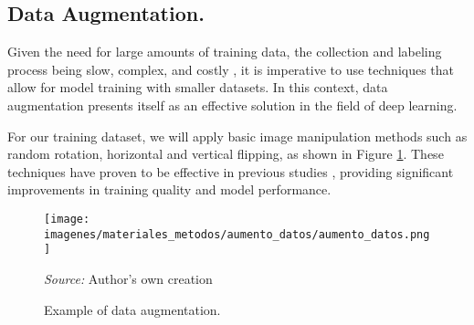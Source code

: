 \subsection{Data Augmentation.}

Given the need for large amounts of training data, the collection and labeling process being slow, complex, and costly \cite{22Toke2020}, it is imperative to use techniques that allow for model training with smaller datasets. In this context, data augmentation presents itself as an effective solution in the field of deep learning.

For our training dataset, we will apply basic image manipulation methods such as random rotation, horizontal and vertical flipping, as shown in Figure \ref{fig:aumento_datos}. These techniques have proven to be effective in previous studies \cite{9Martins2019, 14Molina-Rotger2023, 15Gonzalez-Lopez2022, 16Mamdouh2021}, providing significant improvements in training quality and model performance.

\begin{figure}[htbp]
    \centering
    \texttt{[image: imagenes/materiales\_metodos/aumento\_datos/aumento\_datos.png]}
    \caption{Example of data augmentation.}
    \scriptsize \textit{Source:} Author's own creation
    \label{fig:aumento_datos}
\end{figure}
